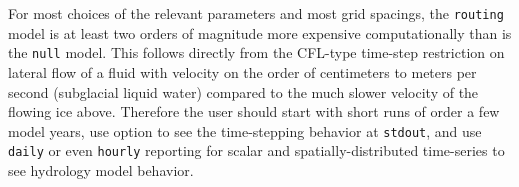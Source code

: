 For most choices of the relevant parameters and most grid spacings, the \texttt{routing} model is at least two orders of magnitude more expensive computationally than is the \texttt{null} model.  This follows directly from the CFL-type time-step restriction on lateral flow of a fluid with velocity on the order of centimeters to meters per second  (subglacial liquid water) compared to the much slower velocity of the flowing ice above.  Therefore the user should start with short runs of order a few model years, use option  to see the time-stepping behavior at \texttt{stdout}, and use \texttt{daily} or even \texttt{hourly} reporting for scalar and spatially-distributed time-series to see hydrology model behavior.
 


